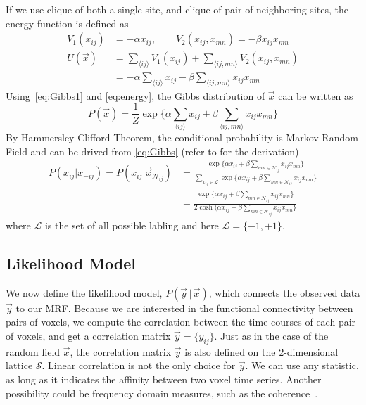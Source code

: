 \documentclass[12pt]{article}
\begin{document}
If we use clique of both a single site, and clique of
pair of neighboring sites, the energy function is defined as
\begin{align}
  V_1(x_{ij}) &= - \alpha x_{ij}, \qquad
  V_2(x_{ij}, x_{mn}) = -\beta x_{ij} x_{mn} \nonumber\\
  U(\vec x) &= \sum_{\langle ij \rangle} V_1(x_{ij}) + \sum_{\langle ij, mn \rangle} V_2(x_{ij}, x_{mn}) \nonumber\\
  &= - \alpha \sum_{\langle ij \rangle}  x_{ij} - \beta \sum_{\langle ij, mn \rangle} x_{ij} x_{mn} \label{eq:energy}
\end{align}
Using~\eqref{eq:Gibbs1} and \eqref{eq:energy}, the Gibbs
distribution of $\vec x$ can be written as
\begin{equation}
  P(\vec x) = \frac{1}{Z}\exp\{ \alpha \sum_{\langle ij \rangle}  x_{ij} + \beta \sum_{\langle ij, mn \rangle} x_{ij} x_{mn} \}
  \label{eq:Gibbs}
\end{equation}
By Hammersley-Clifford Theorem, the conditional probability is
Markov Random Field and can be drived from \eqref{eq:Gibbs} (refer
to \citet[sec 1.2]{li_markov_2009} for the derivation)
\begin{align}
  P(x_{ij} | x_{-ij}) = P(x_{ij} | \vec x_{\mathcal{N}_{ij}}) &= \frac{\exp \{ \alpha x_{ij} + \beta \sum_{mn\in \mathcal{N}_{ij}} x_{ij} x_{mn}\}}{\sum_{x_{ij} \in \mathcal{L}} \exp \{ \alpha x_{ij} + \beta \sum_{mn\in \mathcal{N}_{ij}} x_{ij} x_{mn}\} } \nonumber \\
  &= \frac{\exp \{ \alpha x_{ij} + \beta \sum_{mn\in \mathcal{N}_{ij}} x_{ij} x_{mn}\}}{2\cosh( \alpha x_{ij} + \beta \sum_{mn\in \mathcal{N}_{ij}} x_{ij} x_{mn}\} }\label{eq:cond}
\end{align}
where $\mathcal{L}$ is the set of all possible labling and here
$\mathcal{L} = \{-1, +1\}$.  

\subsection{Likelihood Model}
We now define the likelihood model, $P(\vec y \, | \, \vec x)$,
which connects the observed data $\vec y$ to our MRF. Because we are
interested in the functional connectivity between pairs of voxels,
we compute the correlation between the time courses of each pair of
voxels, and get a correlation matrix $\vec y = \{y_{ij}\}$. Just as
in the case of the random field $\vec x$, the correlation matrix
$\vec y$ is also defined on the $2$-dimensional lattice
$\mathcal{S}$. Linear correlation is not the only choice for $\vec
y$. We can use any statistic, as long as it indicates the affinity
between two voxel time series. Another possibility could be
frequency domain measures, such as the
coherence~\citep{mller_multivariate_2001}.
\end{document}
